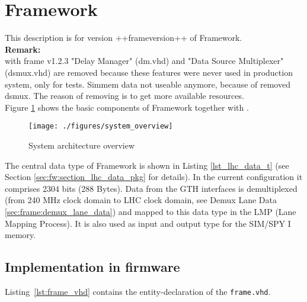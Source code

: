 \section{Framework}\label{sec:frame:framework}

This description is for version ++frameversion++ of Framework.\\

\textbf{Remark:}\\
with frame v1.2.3 "Delay Manager" (dm.vhd) and "Data Source Multiplexer" (dsmux.vhd) are removed because these features were never used in production system, only for tests.
Simmem data not useable anymore, because of removed dsmux.
The reason of removing is to get more available resources.\\

Figure \ref{fig_system_overview} shows the basic components of Framework together with \rop.

\begin{figure}[h]
\texttt{[image: ./figures/system\_overview]}
\caption{System architecture overview}
\label{fig_system_overview}
\end{figure}

The central data type of Framework is shown in Listing \ref{lst_lhc_data_t} (see Section \ref{sec:fw:section_lhc_data_pkg} for details). In the current configuration it comprises
2304 bits (288 Bytes). Data from the GTH interfaces is demultiplexed (from 240 MHz clock domain to LHC clock domain, see Demux Lane Data \ref{sec:frame:demux_lane_data}) and mapped to this data type in the LMP (Lane Mapping Process). It is also used as input and output type for the SIM/SPY I memory.

\subsection{Implementation in firmware}
\label{sec:frame:implementation_firmware}

Listing~\ref{lst:frame_vhd} contains the entity-declaration of the \texttt{frame.vhd}.\\




